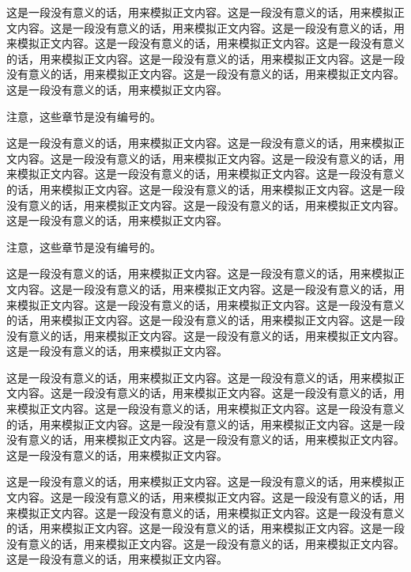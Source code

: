 这是一段没有意义的话，用来模拟正文内容。这是一段没有意义的话，用来模拟正文内容。这是一段没有意义的话，用来模拟正文内容。这是一段没有意义的话，用来模拟正文内容。这是一段没有意义的话，用来模拟正文内容。这是一段没有意义的话，用来模拟正文内容。这是一段没有意义的话，用来模拟正文内容。这是一段没有意义的话，用来模拟正文内容。这是一段没有意义的话，用来模拟正文内容。这是一段没有意义的话，用来模拟正文内容。




注意，这些章节是没有编号的。

这是一段没有意义的话，用来模拟正文内容。这是一段没有意义的话，用来模拟正文内容。这是一段没有意义的话，用来模拟正文内容。这是一段没有意义的话，用来模拟正文内容。这是一段没有意义的话，用来模拟正文内容。这是一段没有意义的话，用来模拟正文内容。这是一段没有意义的话，用来模拟正文内容。这是一段没有意义的话，用来模拟正文内容。这是一段没有意义的话，用来模拟正文内容。这是一段没有意义的话，用来模拟正文内容。


注意，这些章节是没有编号的。

这是一段没有意义的话，用来模拟正文内容。这是一段没有意义的话，用来模拟正文内容。这是一段没有意义的话，用来模拟正文内容。这是一段没有意义的话，用来模拟正文内容。这是一段没有意义的话，用来模拟正文内容。这是一段没有意义的话，用来模拟正文内容。这是一段没有意义的话，用来模拟正文内容。这是一段没有意义的话，用来模拟正文内容。这是一段没有意义的话，用来模拟正文内容。这是一段没有意义的话，用来模拟正文内容。


这是一段没有意义的话，用来模拟正文内容。这是一段没有意义的话，用来模拟正文内容。这是一段没有意义的话，用来模拟正文内容。这是一段没有意义的话，用来模拟正文内容。这是一段没有意义的话，用来模拟正文内容。这是一段没有意义的话，用来模拟正文内容。这是一段没有意义的话，用来模拟正文内容。这是一段没有意义的话，用来模拟正文内容。这是一段没有意义的话，用来模拟正文内容。这是一段没有意义的话，用来模拟正文内容。


这是一段没有意义的话，用来模拟正文内容。这是一段没有意义的话，用来模拟正文内容。这是一段没有意义的话，用来模拟正文内容。这是一段没有意义的话，用来模拟正文内容。这是一段没有意义的话，用来模拟正文内容。这是一段没有意义的话，用来模拟正文内容。这是一段没有意义的话，用来模拟正文内容。这是一段没有意义的话，用来模拟正文内容。这是一段没有意义的话，用来模拟正文内容。这是一段没有意义的话，用来模拟正文内容。

